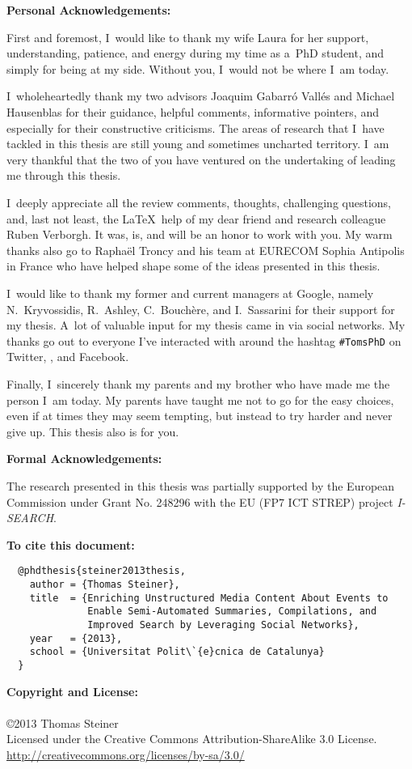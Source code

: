 \begin{acknowledgements}

\textbf{Personal Acknowledgements:}

First and foremost, I~would like to thank my wife Laura
for her support, understanding, patience, and energy
during my time as a~PhD student, and simply for being at my side.
Without you, I~would not be where I~am today.

I~wholeheartedly thank my two advisors Joaquim Gabarró Vallés
and Michael Hausenblas for their guidance, helpful comments,
informative pointers, and especially
for their constructive criticisms.
The areas of research that I~have tackled in this thesis
are still young and sometimes uncharted territory.
I~am very thankful that the two of you have ventured
on the undertaking of leading me through this thesis.

I~deeply appreciate all the review comments, thoughts, challenging questions,
and, last not least, the \LaTeX~help of my dear friend
and research colleague Ruben Verborgh.
It was, is, and will be an honor to work with you.
My warm thanks also go to Raphaël Troncy and his team
at \mbox{EURECOM} Sophia Antipolis in France
who have helped shape some of the ideas presented in this thesis.

I~would like to thank my former and current managers at Google,
namely N.~Kryvossidis, R.~Ashley, C.~Bouchère, and I.~Sassarini
for their support for my thesis.
A~lot of valuable input for my thesis came in via social networks.
My thanks go out to everyone I've interacted with
around the hashtag \texttt{\#TomsPhD}
on Twitter, \googleplus, and Facebook.

Finally, I~sincerely thank my parents and my brother
who have made me the person I~am today.
My parents have taught me
not to go for the easy choices, even
if at times they may seem tempting,
but instead to try harder and never give up.
This thesis also is for you.

\textbf{Formal Acknowledgements:}

The research presented in this thesis
was partially supported by the European Commission
under Grant No. 248296 with the EU (FP7 ICT STREP)
project \mbox{\emph{I-SEARCH}}.

\vspace{80mm}

\textbf{To cite this document:}

\small
\begin{verbatim}
  @phdthesis{steiner2013thesis,
    author = {Thomas Steiner},
    title  = {Enriching Unstructured Media Content About Events to
              Enable Semi-Automated Summaries, Compilations, and
              Improved Search by Leveraging Social Networks},
    year   = {2013},
    school = {Universitat Polit\`{e}cnica de Catalunya}
  }
\end{verbatim}

\normalsize

\vspace{10mm}
\textbf{Copyright and License:}\\\\
\small \copyright \normalsize 2013 Thomas Steiner\\
Licensed under the Creative Commons Attribution-ShareAlike 3.0 License.\\
\url{http://creativecommons.org/licenses/by-sa/3.0/}

\end{acknowledgements}
